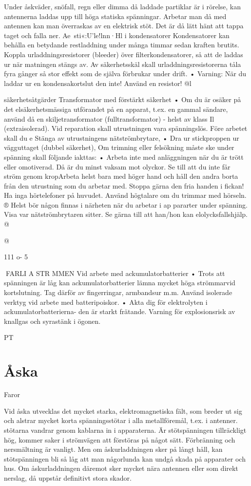 Under åskväder, snöfall, regn eller dimma
då laddade partiklar är i rörelse, kan antennerna laddas upp till höga statiska spänningar. Arbetar man då med antennen kan man
överraskas av en elektrisk stöt. Det är då lätt
hänt att tappa taget och falla ner.
Ae~sti«:U'le!lnn·Hl i kondensatorer
Kondensatorer kan behålla en betydande
restladdning under många timmar sedan
kraften brutits.
Koppla urladdningsresistorer (bleeder)
över filterkondensatorer, så att de laddas
ur när matningen stängs av. Av säkerhetsskäl skall urladdningsresistorerna tåla
fyra gånger så stor effekt som de själva
förbrukar under drift.
• Varning: När du laddar ur en kondensakortslut den inte! Använd en resistor!
@l

säkerhetsåtgärder
Transformator med förstärkt säkerhet
• Om du är osäker på det elsäkerhetsmässiga utförandet på en apparat, t.ex. en
gammal sändare, använd då en skiljetransformator (fulltransformator) - helst
av klass Il (extraisolerad).
Vid reparation skall utrustningen vara spänningslös. Före arbetet skall du
e
Stänga av utrustningens nätströmbrytare,
• Dra ur stickproppen ur vägguttaget (dubbel säkerhet),
Om trimning eller felsökning måste ske under spänning skall följande iakttas:
• Arbeta inte med anläggningen när du är
trött eller omotiverad. Då är du minst
vaksam mot olyckor.
Se till att du inte får ström genom kropArbeta helst bara med höger hand
och håll den andra borta från den utrustning som du arbetar med. Stoppa gärna
den fria handen i fickan!
Ha inga hörtelefoner på huvudet. Använd
högtalare om du trimmar med hörseln.
®
Helst bör någon finnas i närheten när du
arbetar i ap pararter under spänning. Visa
var nätströmbrytaren sitter. Se gärna till
att han/hon kan elolycksfallshjälp.
@

@

111 o- 5

FARLI A STR MMEN
Vid arbete med ackumulatorbatterier
• Trots att spänningen är låg kan ackumulatorbatterier lämna mycket höga strömmarvid kortslutning. Tag därför av fingerringar, armbandsur m.m. Använd isolerade verktyg vid arbete med batteripoiskor.
• Akta dig för elektrolyten i ackumulatorbatterierna- den är starkt frätande.
Varning för explosionsrisk av knallgas
och syrastänk i ögonen.

PT
\section{Åska}
Faror

Vid åska utvecklas det mycket starka,
elektromagnetiska fält, som breder ut sig
och alstrar mycket korta spänningsstötar i
alla metallföremål, t.ex. i antenner. stötarna
vandrar genom kablarna in i apparaterna. Är
stötspänningen tillräckligt hög, kommer saker i strömvägen att förstöras på något sätt.
Förbränning och nersmältning är vanligt.
Men om åskurladdningen sker på långt håll,
kan stötspänningen bli så låg att man någorlunda kan undgå skada på apparater och
hus. Om åskurladdningen däremot sker
mycket nära antennen eller som direkt nerslag, då uppstår definitivt stora skador.

